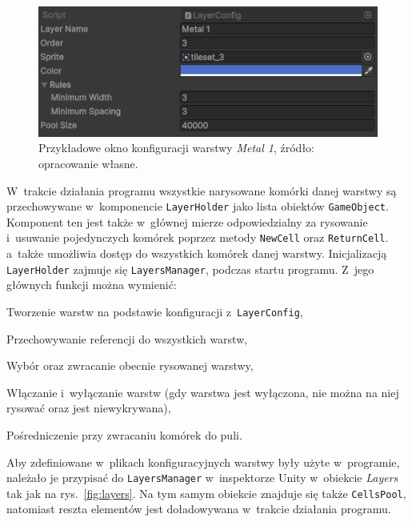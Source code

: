 \begin{figure}[h]
    \centering
    \includegraphics[width=.9\textwidth]{chapters/chapter4/rys/layer_config}
    \caption[Przykładowe okno konfiguracji warstwy \textit{Metal 1}.]
    {Przykładowe okno konfiguracji warstwy \textit{Metal 1}, źródło: opracowanie własne.}
    \label{fig:layer_config}
\end{figure}

\indent W~trakcie działania programu wszystkie narysowane komórki danej warstwy
są przechowywane w~komponencie \texttt{LayerHolder} jako lista obiektów \texttt{GameObject}.
Komponent ten jest także w~głównej mierze odpowiedzialny za rysowanie
i~usuwanie pojedynczych komórek poprzez metody \texttt{NewCell} oraz \texttt{ReturnCell}.
a~także umożliwia dostęp do wszystkich komórek danej warstwy.
Inicjalizacją \texttt{LayerHolder} zajmuje się \texttt{LayersManager}, podczas startu programu.
Z~jego głównych funkcji można wymienić:

\begin{citemize}
    \item Tworzenie warstw na podstawie konfiguracji z~\texttt{LayerConfig},
    \item Przechowywanie referencji do wszystkich warstw,
    \item Wybór oraz zwracanie obecnie rysowanej warstwy,
    \item Włączanie i~wyłączanie warstw (gdy warstwa jest wyłączona, nie można na niej rysować oraz jest niewykrywana),
    \item Pośredniczenie przy zwracaniu komórek do puli.
\end{citemize}


Aby zdefiniowane w~plikach konfiguracyjnych warstwy były użyte w~programie,
należało je przypisać do \texttt{LayersManager} w~inspektorze Unity w~obiekcie \textit{Layers} tak jak na rys.~\ref{fig:layers}.
Na tym samym obiekcie znajduje się także \texttt{CellsPool},
natomiast reszta elementów jest doładowywana w~trakcie działania programu.

\newpage %

